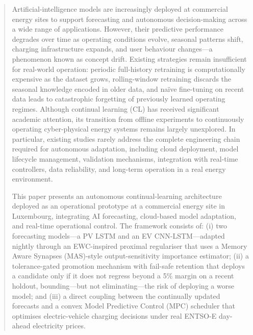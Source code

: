 \documentclass[journal]{IEEEtran}
\begin{document}
 \begin{abstract}
Artificial-intelligence models are increasingly deployed at commercial energy sites to support forecasting and autonomous decision-making across a wide range of applications. However, their predictive performance degrades over time as operating conditions evolve, seasonal patterns shift, charging infrastructure expands, and user behaviour changes---a phenomenon known as concept drift. Existing strategies remain insufficient for real-world operation: periodic full-history retraining is computationally expensive as the dataset grows, rolling-window retraining discards the seasonal knowledge encoded in older data, and na\"ive fine-tuning on recent data leads to catastrophic forgetting of previously learned operating regimes. Although continual learning (CL) has received significant academic attention, its transition from offline experiments to continuously operating cyber-physical energy systems remains largely unexplored. In particular, existing studies rarely address the complete engineering chain required for autonomous adaptation, including cloud deployment, model lifecycle management, validation mechanisms, integration with real-time controllers, data reliability, and long-term operation in a real energy environment.

This paper presents an autonomous continual-learning architecture deployed as an operational prototype at a commercial energy site in Luxembourg, integrating AI forecasting, cloud-based model adaptation, and real-time operational control. The framework consists of: (i) two forecasting models---a PV LSTM and an EV CNN-LSTM---adapted nightly through an EWC-inspired proximal regulariser that uses a Memory Aware Synapses (MAS)-style output-sensitivity importance estimator; (ii) a tolerance-gated promotion mechanism with fail-safe retention that deploys a candidate only if it does not regress beyond a 5\% margin on a recent holdout, bounding---but not eliminating---the risk of deploying a worse model; and (iii) a direct coupling between the continually updated forecasts and a convex Model Predictive Control (MPC) scheduler that optimises electric-vehicle charging decisions under real ENTSO-E day-ahead electricity prices.


\end{abstract}
\end{document}
